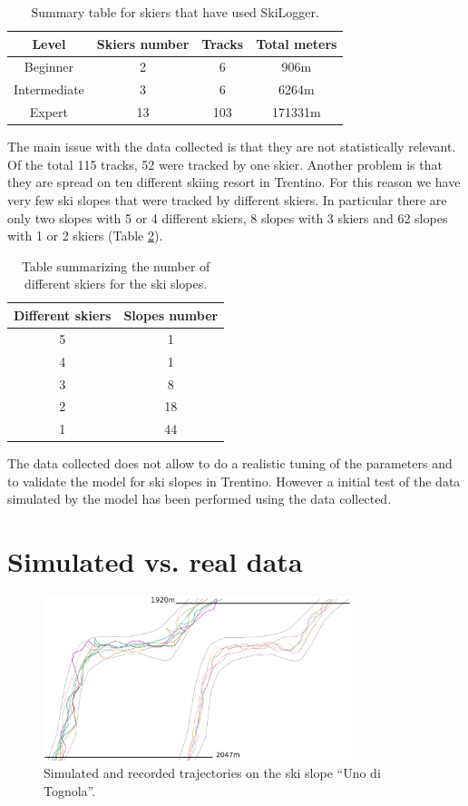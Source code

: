 \documentclass[12pt,a4paper,twoside]{book}
\begin{document}
\begin{table}[!h]
  \centering
  \begin{tabular}{ | c | c | c | c | }
    \hline
    Level & Skiers number & Tracks & Total meters \\
    \hline
    Beginner & 2  & 6 & 906m \\
    Intermediate & 3 & 6 & 6264m \\
    Expert & 13 & 103 & 171331m \\
    \hline
  \end{tabular}
  \caption{Summary table for skiers that have used SkiLogger.}
  \label{skiers}
\end{table}

The main issue with the data collected is that they are not statistically relevant. Of the total 115 tracks, 52 were tracked by one skier. Another problem is that they are spread on ten different skiing resort in Trentino. For this reason we have very few ski slopes that were tracked by different skiers. In particular there are only two slopes with 5 or 4 different skiers, 8 slopes with 3 skiers and 62 slopes with 1 or 2 skiers (Table \ref{slopes}).

\begin{table}[!h]
  \centering
  \begin{tabular}{ | c | c | }
    \hline
    Different skiers & Slopes number \\
    \hline
    5 & 1 \\
    4 & 1 \\
    3 & 8 \\
    2 & 18 \\
    1 & 44 \\
    \hline
  \end{tabular}
  \caption{Table summarizing the number of different skiers for the ski slopes.}
  \label{slopes}
\end{table}

The data collected does not allow to do a realistic tuning of the parameters and to validate the model for ski slopes in Trentino. However a initial test of the data simulated by the model has been performed using the data collected.

\section{Simulated vs. real data}
\begin{figure}[!h]
  \centering
    \includegraphics[width=0.8\textwidth]{images/traiettorie.eps}
    \caption{Simulated and recorded trajectories on the ski slope ``Uno di Tognola''.}\label{traj}
\end{figure}
\end{document}
